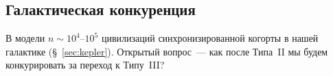 \documentclass[12pt,a4paper]{article}
\begin{document}
\subsection{Галактическая конкуренция}
\label{sec:galactic_competition}

В модели $n \sim 10^4$--$10^5$ цивилизаций синхронизированной когорты в нашей галактике (\S~\ref{sec:kepler}). Открытый вопрос~--- как после Типа~II мы будем конкурировать за переход к Типу~III?



\end{document}
